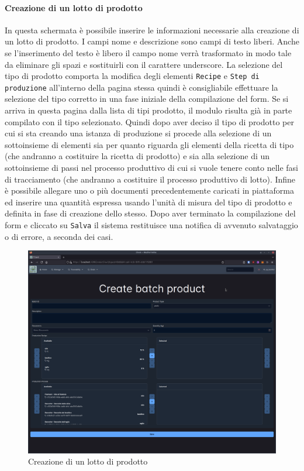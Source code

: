 \documentclass[a4paper,11pt]{article}
\begin{document}
\paragraph{Creazione di un lotto di prodotto} In questa schermata è possibile inserire le informazioni necessarie alla creazione di un lotto di prodotto. I campi nome e descrizione sono campi di testo liberi. Anche se l'inserimento del testo è libero il campo nome verrà trasformato in modo tale da eliminare gli spazi e sostituirli con il carattere underscore. La selezione del tipo di prodotto comporta la modifica degli elementi \texttt{Recipe} e \texttt{Step di produzione} all'interno della pagina stessa quindi è consigliabile effettuare la selezione del tipo corretto in una fase iniziale della compilazione del form. Se si arriva in questa pagina dalla lista di tipi prodotto, il modulo risulta già in parte compilato con il tipo selezionato. Quindi dopo aver deciso il tipo di prodotto per cui si sta creando una istanza di produzione si procede alla selezione di un sottoinsieme di elementi sia per quanto riguarda gli elementi della ricetta di tipo (che andranno a costituire la ricetta di prodotto) e sia alla selezione di un sottoinsieme di passi nel processo produttivo di cui si vuole tenere conto nelle fasi di tracciamento (che andranno a costituire il processo produttivo di lotto). Infine è possibile allegare uno o più documenti precedentemente caricati in piattaforma ed inserire una quantità espressa usando l'unità di misura del tipo di prodotto e definita in fase di creazione dello stesso. Dopo aver terminato la compilazione del form e cliccato su \texttt{Salva} il sistema restituisce una notifica di avvenuto salvataggio o di errore, a seconda dei casi.

\begin{figure}[H]
  \centering
  \includegraphics[width=0.5\linewidth]{screenIotChain/0010.png}
  \caption{Creazione di un lotto di prodotto}
  \label{fig:screen10}
\end{figure}
\end{document}
